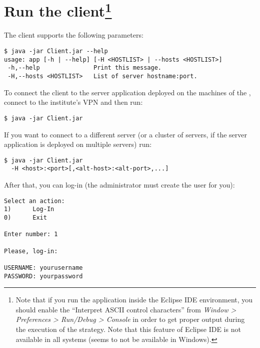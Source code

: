 \section[Run the client]{Run the client\footnote{Note that if you run the
application inside the Eclipse IDE environment, you should enable the
``Interpret ASCII control characters'' from \textit{Window > Preferences >
Run/Debug > Console} in order to get proper output during the execution of the
strategy. Note that this feature of Eclipse IDE is not available in all systems
(seems to not be available in Windows).}}\label{sec:clientrun}

The client supports the following parameters:

\begin{verbatim}
$ java -jar Client.jar --help
usage: app [-h | --help] [-H <HOSTLIST> | --hosts <HOSTLIST>]
 -h,--help               Print this message.
 -H,--hosts <HOSTLIST>   List of server hostname:port.
\end{verbatim}

To connect the client to the server application deployed on the machines of the
\theinstitute, connect to the institute's VPN and then run:

\begin{verbatim}
$ java -jar Client.jar
\end{verbatim}

If you want to connect to a different server (or a cluster of servers, if the
server application is deployed on multiple servers) run:

\begin{verbatim}
$ java -jar Client.jar
  -H <host>:<port>[,<alt-host>:<alt-port>,...]
\end{verbatim}

After that, you can log-in (the administrator must create the user for you):

\begin{verbatim}
Select an action:
1)      Log-In
0)      Exit

Enter number: 1

Please, log-in:

USERNAME: yourusername
PASSWORD: yourpassword
\end{verbatim}
